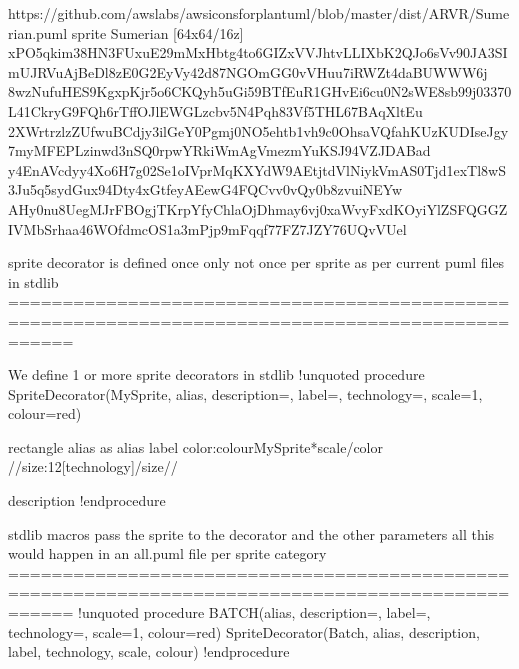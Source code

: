 \documentclass[letterpaper,10pt,english]{sphinxmanual}
\begin{document}
\begin{sphinxVerbatim}[commandchars=\\\{\},numbers=left,firstnumber=1,stepnumber=1]
\PYGZsq{}https://github.com/awslabs/aws\PYGZhy{}icons\PYGZhy{}for\PYGZhy{}plantuml/blob/master/dist/ARVR/Sumerian.puml
sprite \PYGZdl{}Sumerian [64x64/16z] \PYGZob{}
xPO5qkim38HN3FU\PYGZus{}xuE29mMx\PYGZhy{}Hbtg4to6GIZxVVJhtvLLI\PYGZhy{}XbK2QJo6sVv90JA3SImUJRVuAjBeDl8zE0G2EyVy42d87NGOmGG0vVHuu7iRWZt4daBUWWW6j
8w\PYGZus{}zNufuHES9KgxpKjr5o6CKQyh5uGi59BTfEuR1GHvEi6cu0N2sWE8sb99j03370L41CkryG9FQh6rTffOJlEWGLz\PYGZhy{}cbv5N4Pqh83Vf5THL67BA\PYGZhy{}qXltEu\PYGZus{}
2XWrtrzlzZUfwuBCdjy\PYGZus{}3ilGeY0Pgmj0NO5ehtb1vh9c0OhsaV\PYGZus{}Qfa\PYGZus{}hKUzKUDIs\PYGZus{}eJgy7myMFEPLzinwd3nSQ0rpwYR\PYGZus{}kiWmAgVmezmYuKSJ\PYGZus{}94VZJDABad
y4EnAVcdyy4Xo6H\PYGZus{}7g\PYGZhy{}02Se1oIVprMqKX\PYGZus{}YdW9\PYGZus{}AEtjtdVlNiykVmAS0Tjd\PYGZus{}1exTl8wS3Ju5q5sydGux\PYGZhy{}94Dty4xGtfeyAEewG4FQCvv0vQy0b8zvuiN\PYGZus{}EYw
AHy0nu8Ue\PYGZhy{}gMJrFBOgjTKr\PYGZus{}pYfyChlaOjDhmay6vj0xaWvyFxdKOyiYlZSFQGGZIVMbSrhaa46WOf\PYGZhy{}dmcOS1a3mPjp9mFqqf77FZ\PYGZhy{}7JZ\PYGZhy{}Y76UQvV\PYGZus{}Uel
\PYGZcb{}


\PYGZsq{} sprite decorator is defined once only \PYGZhy{} not once per sprite as per current puml files in stdlib
\PYGZsq{}==================================================================================================

\PYGZsq{} We define 1 or more sprite decorators in stdlib
\PYGZsq{}\PYGZhy{}\PYGZhy{}\PYGZhy{}\PYGZhy{}\PYGZhy{}\PYGZhy{}\PYGZhy{}\PYGZhy{}\PYGZhy{}\PYGZhy{}\PYGZhy{}\PYGZhy{}\PYGZhy{}\PYGZhy{}\PYGZhy{}\PYGZhy{}\PYGZhy{}\PYGZhy{}\PYGZhy{}\PYGZhy{}\PYGZhy{}\PYGZhy{}\PYGZhy{}\PYGZhy{}\PYGZhy{}\PYGZhy{}\PYGZhy{}\PYGZhy{}\PYGZhy{}\PYGZhy{}\PYGZhy{}\PYGZhy{}\PYGZhy{}\PYGZhy{}\PYGZhy{}\PYGZhy{}\PYGZhy{}\PYGZhy{}\PYGZhy{}\PYGZhy{}\PYGZhy{}\PYGZhy{}\PYGZhy{}\PYGZhy{}\PYGZhy{}\PYGZhy{}\PYGZhy{}\PYGZhy{}\PYGZhy{}\PYGZhy{}\PYGZhy{}
!unquoted procedure \PYGZdl{}SpriteDecorator(\PYGZdl{}MySprite, \PYGZdl{}alias, \PYGZdl{}description=\PYGZdq{}\PYGZdq{}, \PYGZdl{}label=\PYGZdq{}\PYGZdq{}, \PYGZdl{}technology=\PYGZdq{}\PYGZdq{}, \PYGZdl{}scale=1, \PYGZdl{}colour=\PYGZdq{}red\PYGZdq{})

rectangle \PYGZdl{}alias as \PYGZdq{}
\PYGZlt{}\PYGZlt{}\PYGZdl{}alias\PYGZgt{}\PYGZgt{}
\PYGZdl{}label
\PYGZlt{}color:\PYGZdl{}colour\PYGZgt{}\PYGZlt{}\PYGZdl{}MySprite*\PYGZdl{}scale\PYGZgt{}\PYGZlt{}/color\PYGZgt{}
//\PYGZlt{}size:12\PYGZgt{}[\PYGZdl{}technology]\PYGZlt{}/size\PYGZgt{}//

  \PYGZdl{}description\PYGZdq{}
!endprocedure

\PYGZsq{}stdlib macros pass the sprite to the decorator \PYGZhy{} and the other parameters
\PYGZsq{}all this would happen in an all.puml file per sprite category
\PYGZsq{}==================================================================================================
!unquoted procedure \PYGZdl{}BATCH(\PYGZdl{}alias, \PYGZdl{}description=\PYGZdq{}\PYGZdq{}, \PYGZdl{}label=\PYGZdq{}\PYGZdq{}, \PYGZdl{}technology=\PYGZdq{}\PYGZdq{}, \PYGZdl{}scale=1, \PYGZdl{}colour=\PYGZdq{}red\PYGZdq{})
\PYGZdl{}SpriteDecorator(\PYGZdl{}Batch, \PYGZdl{}alias, \PYGZdl{}description, \PYGZdl{}label, \PYGZdl{}technology, \PYGZdl{}scale, \PYGZdl{}colour)
!endprocedure


\end{sphinxVerbatim}
\end{document}
